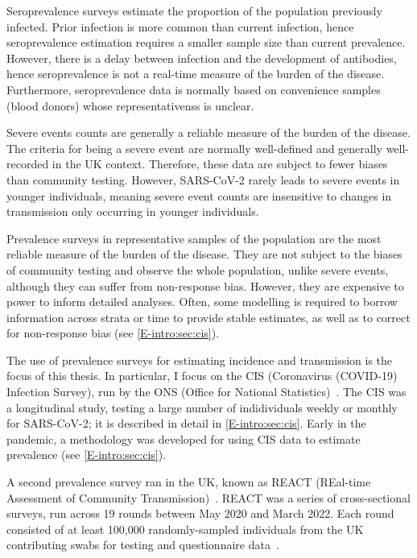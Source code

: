 \documentclass[thesis.tex]{subfiles}
\begin{document}
Seroprevalence surveys estimate the proportion of the population previously infected.
Prior infection is more common than current infection, hence seroprevalence estimation requires a smaller sample size than current prevalence.
However, there is a delay between infection and the development of antibodies, hence seroprevalence is not a real-time measure of the burden of the disease.
Furthermore, seroprevalence data is normally based on convenience samples (\eg blood donors) whose representativenss is unclear.

Severe events counts are generally a reliable measure of the burden of the disease.
The criteria for being a severe event are normally well-defined and generally well-recorded in the UK context.
Therefore, these data are subject to fewer biases than community testing.
However, SARS-CoV-2 rarely leads to severe events in younger individuals, meaning severe event counts are insensitive to changes in transmission only occurring in younger individuals.

Prevalence surveys in representative samples of the population are the most reliable measure of the burden of the disease.
They are not subject to the biases of community testing and observe the whole population, unlike severe events, although they can suffer from non-response bias.
However, they are expensive to power to inform detailed analyses.
Often, some modelling is required to borrow information across strata or time to provide stable estimates, as well as to correct for non-response bias (see \cref{E-intro:sec:cis}).

The use of prevalence surveys for estimating incidence and transmission is the focus of this thesis.
In particular, I focus on the CIS (Coronavirus (COVID-19) Infection Survey), run by the ONS (Office for National Statistics)~\autocite{CIS,cisMethodsONS}.
The CIS was a longitudinal study, testing a large number of indidividuals weekly or monthly for SARS-CoV-2; it is described in detail in \cref{E-intro:sec:cis}.
Early in the pandemic, a methodology was developed for using CIS data to estimate prevalence (see \cref{E-intro:sec:cis}).

A second prevalence survey ran in the UK, known as REACT (REal-time Assessment of Community Transmission)~\autocite{rileyResurgence,rileyREACT}.
REACT was a series of cross-sectional surveys, run across 19 rounds between May 2020 and March 2022.
Each round consisted of at least 100,000 randomly-sampled individuals from the UK contributing swabs for testing and questionnaire data~\autocite{elliottTwin}.
\end{document}
